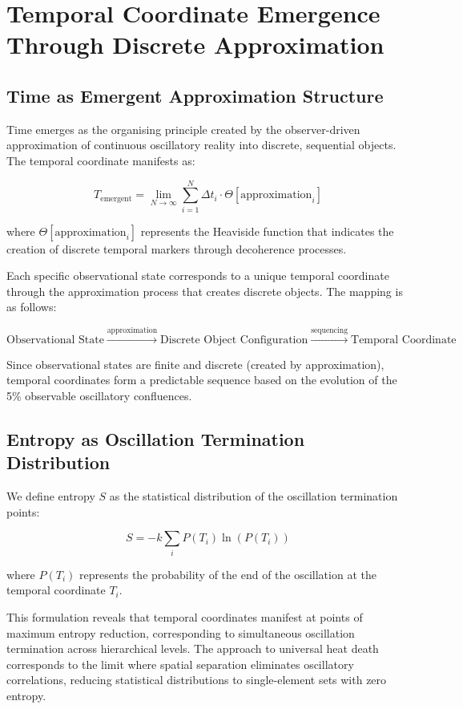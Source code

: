 \documentclass[12pt,a4paper]{article}
\begin{document}
\section{Temporal Coordinate Emergence Through Discrete Approximation}

\subsection{Time as Emergent Approximation Structure}

Time emerges as the organising principle created by the observer-driven approximation of continuous oscillatory reality into discrete, sequential objects. The temporal coordinate manifests as:

$$T_{\text{emergent}} = \lim_{N \to \infty} \sum_{i=1}^{N} \Delta t_i \cdot \Theta[\text{approximation}_i]$$

where $\Theta[\text{approximation}_i]$ represents the Heaviside function that indicates the creation of discrete temporal markers through decoherence processes.

Each specific observational state corresponds to a unique temporal coordinate through the approximation process that creates discrete objects. The mapping is as follows:

$$\text{Observational State} \xrightarrow{\text{approximation}} \text{Discrete Object Configuration} \xrightarrow{\text{sequencing}} \text{Temporal Coordinate}$$

Since observational states are finite and discrete (created by approximation), temporal coordinates form a predictable sequence based on the evolution of the 5\% observable oscillatory confluences.

\subsection{Entropy as Oscillation Termination Distribution}

We define entropy $S$ as the statistical distribution of the oscillation termination points:

$$S = -k \sum_i P(T_i) \ln(P(T_i))$$

where $P(T_i)$ represents the probability of the end of the oscillation at the temporal coordinate $T_i$.

This formulation reveals that temporal coordinates manifest at points of maximum entropy reduction, corresponding to simultaneous oscillation termination across hierarchical levels. The approach to universal heat death corresponds to the limit where spatial separation eliminates oscillatory correlations, reducing statistical distributions to single-element sets with zero entropy.
\end{document}
